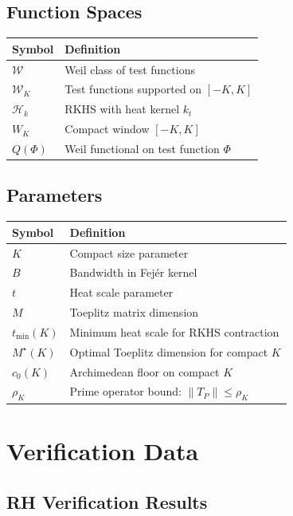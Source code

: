 \subsection{Function Spaces}

\begin{tabular}{ll}
\toprule
\textbf{Symbol} & \textbf{Definition} \\
\midrule
$\mathcal{W}$ & Weil class of test functions \\
$\mathcal{W}_K$ & Test functions supported on $[-K, K]$ \\
$\mathcal{H}_k$ & RKHS with heat kernel $k_t$ \\
$W_K$ & Compact window $[-K, K]$ \\
$Q(\Phi)$ & Weil functional on test function $\Phi$ \\
\bottomrule
\end{tabular}

\subsection{Parameters}

\begin{tabular}{ll}
\toprule
\textbf{Symbol} & \textbf{Definition} \\
\midrule
$K$ & Compact size parameter \\
$B$ & Bandwidth in Fej\'er kernel \\
$t$ & Heat scale parameter \\
$M$ & Toeplitz matrix dimension \\
$t_{\min}(K)$ & Minimum heat scale for RKHS contraction \\
$M^\star(K)$ & Optimal Toeplitz dimension for compact $K$ \\
$c_0(K)$ & Archimedean floor on compact $K$ \\
$\rho_K$ & Prime operator bound: $\|T_P\| \leq \rho_K$ \\
\bottomrule
\end{tabular}

\section{Verification Data}\label{app:verification}

\subsection{RH Verification Results}

